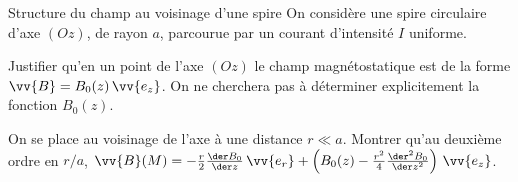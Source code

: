 \begin{exo}[PC][1]{Structure du champ au voisinage d'une spire}
On considère une spire circulaire d'axe $(Oz)$, de rayon $a$, parcourue par un courant d'intensité $I$ uniforme.
\begin{quest}
\item Justifier qu'en un point de l'axe $(Oz)$ le champ magnétostatique est de la forme $\vv{B}=B_{0}(z)\,\vv{e_z}$. On ne cherchera pas à déterminer explicitement la fonction $B_{0}(z)$.
\item On se place au voisinage de l'axe à une distance $r\ll a$. Montrer qu'au deuxième ordre en $r/a$, $\vv{B}(M)=-\frac{r}{2}\frac{\der B_0}{\der z}\,\vv{e_r}+\left(B_0(z)-\frac{r^2}{4}\frac{\der^2 B_0}{\der z^2}\right)\,\vv{e_z}$.
\end{quest}
\end{exo}

